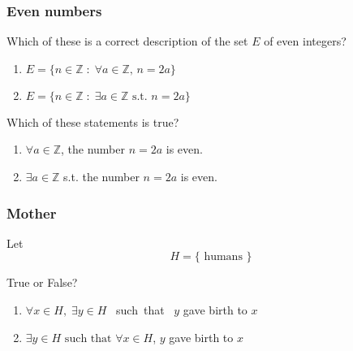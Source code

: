 \documentclass[14pt]{beamer}
\newcommand {\DS} [1] {${\displaystyle #1}$}
\newcommand {\Z}{\mathbb{Z}}
\newcommand{\p}{\pause}
\begin{document}
\begin{frame}[t]
\frametitle{Even numbers}

Which of these is a correct description of the set $E$ of even integers?
\begin{enumerate}
	\item \DS{	E = \{  n \in \Z \; : \; \forall a \in \Z,  \, n = 2a \} }
	\item \DS{	E = \{  n \in \Z \; : \; \exists a \in \Z \mbox{ s.t. } n = 2a \} }
\end{enumerate}

\vfill  \p

Which of these statements is true?
\begin{enumerate}
\addtocounter{enumi}{2}
	\item  \DS{\forall a \in \Z}, the number \DS{n=2a} is even.
	\item  \DS{\exists a \in \Z} s.t. the number \DS{n=2a} is even.
\end{enumerate}

\vfill

\end{frame}

\begin{frame}
\frametitle{Mother}

Let
	$$
		H = \{ \mbox{ humans } \}
	$$

\vfill

True or False?


\begin{enumerate}
	\item  \DS{\forall x \in H, \; \exists y \in H} \mbox{ such that } $y$ gave birth to $x$
	\item  \DS{\exists y \in H \mbox{ such that } \forall x \in H}, $y$ gave birth to $x$ 
\end{enumerate}

\vfill

\end{frame}
\end{document}
